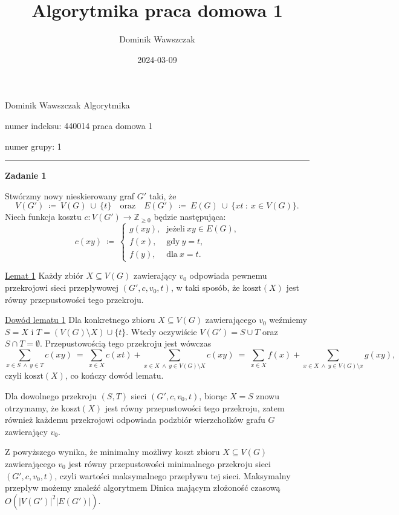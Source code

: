 \documentclass[12pt]{article}
\title{Algorytmika praca domowa 1}
\author{Dominik Wawszczak}
\date{2024-03-09}
\begin{document}
	\setlength{\parindent}{0 cm}
	
	Dominik Wawszczak \hfill Algorytmika
	
	numer indeksu: 440014 \hfill praca domowa 1
	
	numer grupy: 1
	
	\bigskip
	\hrule
	\bigskip
	
	\textbf{Zadanie 1}
	
	\medskip
	
	Stwórzmy nowy nieskierowany graf \(G'\) taki, że
	\[ V(G') \ \coloneqq \ V(G) \ \cup \ \{t\} \quad \text{oraz} \quad E(G') \
	\coloneqq \ E(G) \ \cup \ \{xt \ : \ x \in V(G)\} \text{.} \]
	Niech funkcja kosztu \(c : V(G') \to \mathbb{Z}_{\geqslant 0}\) będzie
	następująca:
	\[ c(xy) \ \coloneqq \ \begin{cases}
		g(xy) \text{,} & \text{jeżeli} \ xy \in E(G) \text{,} \\
		f(x) \text{,} & \text{gdy} \ y = t \text{,} \\
		f(y) \text{,} & \text{dla} \ x = t \text{.}
	\end{cases} \]
	
	\medskip
	
	\underline{Lemat 1} Każdy zbiór \(X \subseteq V(G)\) zawierający \(v_{0}\)
	odpowiada pewnemu przekrojowi sieci przepływowej \((G', c, v_{0}, t)\), w
	taki sposób, że \(\text{koszt}(X)\) jest równy przepustowości tego
	przekroju.
	
	\medskip
	
	\underline{Dowód lematu 1} Dla konkretnego zbioru \(X \subseteq V(G)\)
	zawierającego \(v_{0}\) weźmiemy \(S = X\) i \(T = (V(G) \setminus X)
	\cup \{t\}\). Wtedy oczywiście \(V(G') = S \cup T\) oraz \(S \cap T =
	\emptyset\). Przepustowością tego przekroju jest wówczas
	\[ \sum\limits_{x \in S \ \wedge \ y \in T} c(xy) \ = \ \sum\limits_{x \in
	X} c(xt) + \sum\limits_{x \in X \ \wedge \ y \in V(G) \setminus X} c(xy) \ =
	\ \sum\limits_{x \in X} f(x) + \sum\limits_{x \in X \ \wedge \ y \in V(G)
	\setminus x} g(xy) \text{,} \]
	czyli \(\text{koszt}(X)\), co kończy dowód lematu.
	
	\medskip
	
	Dla dowolnego przekroju \((S, T)\) sieci \((G', c, v_{0}, t)\), biorąc \(X =
	S\) znowu otrzymamy, że \(\text{koszt}(X)\) jest równy przepustowości tego
	przekroju, zatem również każdemu przekrojowi odpowiada podzbiór wierzchołków
	grafu \(G\) zawierający \(v_{0}\).
	
	\medskip
	
	Z powyższego wynika, że minimalny możliwy koszt zbioru \(X \subseteq V(G)\)
	zawierającego \(v_{0}\) jest równy przepustowości minimalnego przekroju
	sieci \((G', c, v_{0}, t)\), czyli wartości maksymalnego przepływu tej
	sieci. Maksymalny przepływ możemy znaleźć algorytmem Dinica mającym
	złożoność czasową \(O \left( |V(G')|^{2} |E(G')| \right)\).
	
\end{document}
